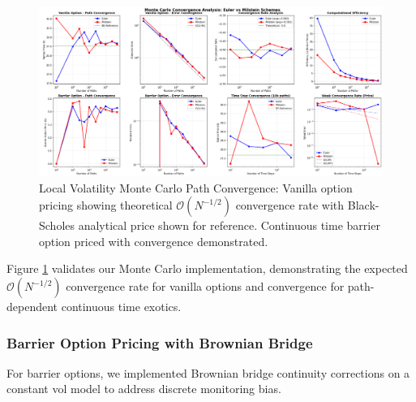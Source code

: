 \documentclass[11pt,a4paper]{article}
\begin{document}
\begin{figure}[H]
\centering
\includegraphics[width=\textwidth]{../charts/Local Vol Charts/convergence_analysis_cropped.png}
\caption{Local Volatility Monte Carlo Path Convergence: Vanilla option pricing showing theoretical $\mathcal{O}(N^{-1/2})$ convergence rate with Black-Scholes analytical price shown for reference. Continuous time barrier option priced with convergence demonstrated.}
\label{fig:mc_convergence}
\end{figure}

Figure \ref{fig:mc_convergence} validates our Monte Carlo implementation, demonstrating the expected $\mathcal{O}(N^{-1/2})$ convergence rate for vanilla options and convergence for path-dependent continuous time exotics. 

\subsubsection{Barrier Option Pricing with Brownian Bridge}

For barrier options, we implemented Brownian bridge continuity corrections \cite{Broadie1997} on a constant vol model to address discrete monitoring bias.
\end{document}
